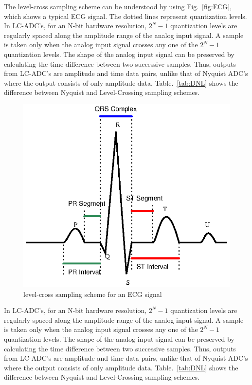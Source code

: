 \par
\hspace{0.6cm} The level-cross sampling scheme can be understood by using Fig.~\ref{fig:ECG}, which shows a typical ECG signal. The dotted lines represent quantization levels. In \mbox{LC-ADC's}, for an N-bit hardware resolution, $2^{N}-1$ quantization levels are regularly spaced along the amplitude range of the analog input signal. A sample is taken only when the analog input signal crosses any one of the $2^{N}-1$ quantization levels. The shape of the analog input signal can be preserved by calculating the time difference between two successive samples. Thus, outputs from \mbox{LC-ADC's} are amplitude and time data pairs, unlike that of Nyquist \mbox{ADC's} where the output consists of only amplitude data. Table.~\ref{tab:DNL} shows the difference between Nyquist and Level-Crossing sampling schemes.


\begin{figure}[ht]
	\begin{center}
		\includegraphics[height=8.5 cm, angle=270]{./Figures/ECG.ps}
		\caption{level-cross sampling scheme for an ECG signal}
		\label{fig:ECGS}
	\end{center}
\end{figure}


\par
\hspace{0.6cm} In \mbox{LC-ADC's}, for an N-bit hardware resolution, $2^{N}-1$ quantization levels are regularly spaced along the amplitude range of the analog input signal. A sample is taken only when the analog input signal crosses any one of the $2^{N}-1$ quantization levels. The shape of the analog input signal can be preserved by calculating the time difference between two successive samples. Thus, outputs from \mbox{LC-ADC's} are amplitude and time data pairs, unlike that of Nyquist \mbox{ADC's} where the output consists of only amplitude data. Table.~\ref{tab:DNL} shows the difference between Nyquist and Level-Crossing sampling schemes. 

